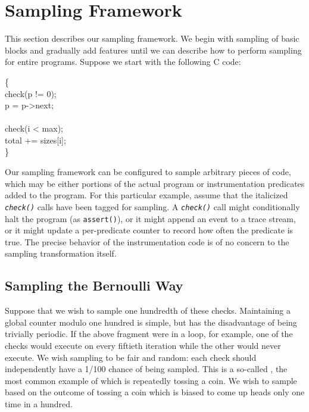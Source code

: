 \section{Sampling Framework}
\label{sec:framework}

This section describes our sampling framework.  We begin with sampling
of basic blocks and gradually add features until we can describe how
to perform sampling for entire programs.  Suppose we start with the
following C code:

\begin{code}
  \{\+ \\
  check(p != 0); \\
  \up p = p->next; \\
  \\
  check(i < max); \\
  \up total += sizes[i]; \\
  \<\}
\end{code}

Our sampling framework can be configured to sample arbitrary pieces of
code, which may be either portions of the actual program or
instrumentation predicates added to the program.  For this particular
example, assume that the italicized \texttt{\textit{check()}} calls
have been tagged for sampling.  A \texttt{\textit{check()}} call might
conditionally halt the program (as \texttt{assert()}), or it might
append an event to a trace stream, or it might update a per-predicate
counter to record how often the predicate is true.  The precise
behavior of the instrumentation code is of no concern to the sampling
transformation itself.

\subsection{Sampling the Bernoulli Way}

Suppose that we wish to sample one hundredth of these checks.
Maintaining a global counter modulo one hundred is simple, but has the
disadvantage of being trivially periodic.  If the above fragment were
in a loop, for example, one of the checks would execute on every
fiftieth iteration while the other would never execute.  We wish
sampling to be fair and random: each check should independently have a
1/100 chance of being sampled.  This is a so-called , the most common example of which is repeatedly tossing a
coin.  We wish to sample based on the outcome of tossing a coin which
is biased to come up heads only one time in a hundred.

